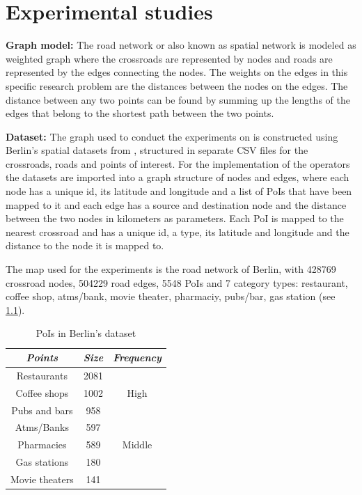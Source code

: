\chapter{Experimental studies}
\label{sec:evaluation}

\textbf{Graph model:}
The road network or also known as spatial network is modeled as weighted graph where the crossroads are represented by nodes and roads are represented by the edges connecting the nodes. The weights on the edges in this specific research problem are the distances between the nodes on the edges. The distance between any two points can be found by summing up the lengths of the edges that belong to the shortest path between the two points.\newline

\textbf{Dataset:}
The graph used to conduct the experiments on is constructed using Berlin's spatial datasets from \cite{datasets}, structured in separate CSV files for the crossroads, roads and points of interest. For the implementation of the operators the datasets are imported into a graph structure of nodes and edges, where each node has a unique id, its latitude and longitude and a list of PoIs that have been mapped to it and each edge has a source and destination node and the distance between the two nodes in kilometers as parameters. Each PoI is mapped to the nearest crossroad and has a unique id, a type, its latitude and longitude and the distance to the node it is mapped to. \newline

The map used for the experiments is the road network of Berlin, with 428769 crossroad nodes, 504229 road edges, 5548 PoIs and 7 category types: restaurant, coffee shop, atms/bank, movie theater, pharmaciy, pubs/bar, gas station (see \ref{dataset}). \newline

\begin{table}[H]
	\centering
	\begin{tabular}{ |c|c|c| } 
		\hline
		\textit{Points} & \textit{Size} & \textit{Frequency}\\
		\hline
		Restaurants & 2081 & \multirow{3}{3em}{High}\\ 
		Coffee shops & 1002 &\\
		Pubs and bars & 958 &\\  
		\hline
		Atms/Banks & 597 & \multirow{3}{3em}{Middle}\\
		Pharmacies & 589 &\\
		\hline
		Gas stations & 180 & \multirow{3}{3em}{Low}\\
		Movie theaters & 141 &\\ 
		\hline
	\end{tabular}
	\caption{PoIs in Berlin's dataset}
	\label{dataset}
\end{table}


